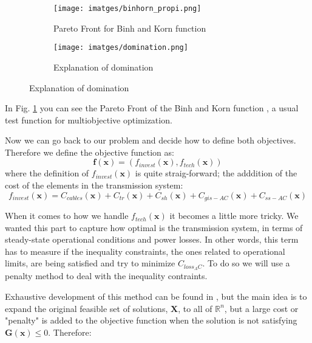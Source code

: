 \documentclass[a4paper,11pt, titlepage, twoside]{article}
\begin{document}
\begin{figure}[H]
    \centering
    \begin{subfigure}{0.45\textwidth}
        \centering
        \texttt{[image: imatges/binhorn\_propi.png]}
        \caption{Pareto Front for Binh and Korn function}
        \label{fig:paretobinhorn}
    \end{subfigure}\hfill
    \begin{subfigure}{0.45\textwidth}
        \centering
        \texttt{[image: imatges/domination.png]}
        \caption{Explanation of domination \cite{domination}}
        \label{fig:domination}
    \end{subfigure}
    \label{fig:both_images}
\end{figure}

In Fig. \ref{fig:paretobinhorn} you can see the Pareto Front of the Binh and Korn function \cite{binhorn}, a usual test function for multiobjective optimization.

Now we can go back to our problem and decide how to define both objectives. Therefore we define the objective function as:
\begin{equation}
    \mathbf{f}(\mathbf{x}) =(f_{invest}(\mathbf{x}),f_{tech}(\mathbf{x}))
\end{equation}
where the definition of $f_{invest}(\mathbf{x})$ is quite straig-forward; the adddition of the cost of the elements in the transmission system:
\begin{equation}
    f_{invest}(\mathbf{x}) = C_{cables}(\mathbf{x}) + C_{tr}(\mathbf{x}) + C_{sh}(\mathbf{x}) + C_{gis-AC}(\mathbf{x}) + C_{ss-AC}(\mathbf{x})
\end{equation}

When it comes to how we handle  $f_{tech}(\mathbf{x})$ it becomes a little more tricky. We wanted this part to capture how optimal is the transmission system, in terms of steady-state operational conditions and power losses. In other words, this term has to measure if the inequality constraints, the ones related to operational
limits, are being satisfied and try to minimize $C_{loss_AC}$. To do so we will use a penalty method to deal with the inequality contraints.\par

Exhaustive development of this method can be found in \cite{penalty}, but the main idea is to expand the original feasible set of solutions, $ \mathbf{X}$, to all of $\mathbb{R}^n$, but a large cost or "penalty" is added to the objective function when the solution is not satisfying
 $\mathbf{G(x)} \leq 0 $. Therefore:
\end{document}
